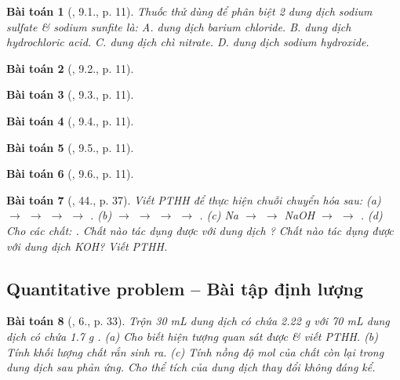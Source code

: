 \documentclass{article}
\newtheorem{baitoan}{Bài toán}
\begin{document}
\begin{baitoan}[\cite{SBT_Hoa_Hoc_9}, 9.1., p. 11]
	Thuốc thử dùng để phân biệt 2 dung dịch sodium sulfate \& sodium sunfite là: {\sf A.} dung dịch barium chloride. {\sf B.} dung dịch hydrochloric acid. {\sf C.} dung dịch chì nitrate. {\sf D.} dung dịch sodium hydroxide.
\end{baitoan}

\begin{baitoan}[\cite{SBT_Hoa_Hoc_9}, 9.2., p. 11]
	
\end{baitoan}

\begin{baitoan}[\cite{SBT_Hoa_Hoc_9}, 9.3., p. 11]
	
\end{baitoan}

\begin{baitoan}[\cite{SBT_Hoa_Hoc_9}, 9.4., p. 11]
	
\end{baitoan}

\begin{baitoan}[\cite{SBT_Hoa_Hoc_9}, 9.5., p. 11]
	
\end{baitoan}

\begin{baitoan}[\cite{SBT_Hoa_Hoc_9}, 9.6., p. 11]
	
\end{baitoan}

\begin{baitoan}[\cite{An_350_BT_Hoa_Hoc_9}, 44., p. 37]
	Viết PTHH để thực hiện chuỗi chuyển hóa sau: (a) \emph{ $\to$  $\to$  $\to$  $\to$ }. (b) \emph{ $\to$  $\to$  $\to$  $\to$ }. (c) \emph{Na $\to$  $\to$ NaOH $\to$  $\to$ }. (d) Cho các chất: \emph{}. Chất nào tác dụng được với dung dịch \emph{}? Chất nào tác dụng được với dung dịch \emph{KOH}? Viết PTHH.
\end{baitoan}

\subsection{Quantitative problem -- Bài tập định lượng}

\begin{baitoan}[\cite{SGK_Hoa_Hoc_9}, 6., p. 33]
	Trộn \emph{30 mL} dung dịch có chứa \emph{2.22 g } với \emph{70 mL} dung dịch có chứa \emph{1.7 g }. (a) Cho biết hiện tượng quan sát được \& viết PTHH. (b) Tính khối lượng chất rắn sinh ra. (c) Tính nồng độ mol của chất còn lại trong dung dịch sau phản ứng. Cho thể tích của dung dịch thay đổi không đáng kể.
\end{baitoan}
\end{document}
